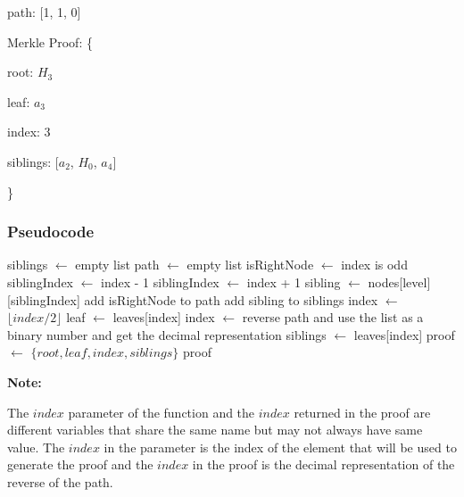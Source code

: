 \documentclass{article}
\begin{document}
path: [1, 1, 0]

Merkle Proof: \{

root: $H_3$

leaf: $a_3$

index: 3

siblings: [$a_2$, $H_0$, $a_4$]

\}


\subsubsection{Pseudocode}

\begin{algorithm}[H]
    \caption{LeanIMT generateProof algorithm}\label{generateProof}
    \begin{algorithmic}[1]
        \State siblings $\gets$ empty list 
        \State path $\gets$ empty list 
        \State isRightNode $\gets$ index is odd
         
        \State siblingIndex $\gets$ index - 1
        \Else {}
        \State siblingIndex $\gets$ index + 1
        \EndIf
        \State sibling $\gets$ nodes[level][siblingIndex]
        \State add isRightNode to path
        \State add sibling to siblings
        \EndIf
        \State index $\gets$ $\lfloor index/2 \rfloor$ 
        \EndFor
        \State leaf $\gets$ leaves[index]
        \State index $\gets$ reverse path and use the list as a binary number and get the decimal representation
        \State siblings $\gets$ leaves[index]
        \State proof $\gets$ $\{root, leaf , index, siblings \}$
        \State \Return proof
        \EndProcedure
    \end{algorithmic}
\end{algorithm}

\textbf{Note:}

The $index$ parameter of the function and the $index$ returned in the proof are different variables that share the same name but may not always have same value. The $index$ in the parameter is the index of the element that will be used to generate the proof and the $index$ in the proof is the decimal representation of the reverse of the path.
\end{document}
